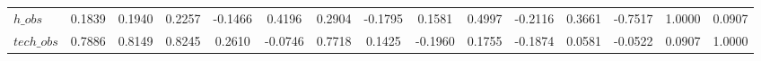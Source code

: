 \begin{center}
\begin{longtable}{lcccccccccccccc}
$h\_obs         $	 & 	           0.1839	 & 	           0.1940	 & 	           0.2257	 & 	          -0.1466	 & 	           0.4196	 & 	           0.2904	 & 	          -0.1795	 & 	           0.1581	 & 	           0.4997	 & 	          -0.2116	 & 	           0.3661	 & 	          -0.7517	 & 	           1.0000	 & 	           0.0907 \\ 
$tech\_obs      $	 & 	           0.7886	 & 	           0.8149	 & 	           0.8245	 & 	           0.2610	 & 	          -0.0746	 & 	           0.7718	 & 	           0.1425	 & 	          -0.1960	 & 	           0.1755	 & 	          -0.1874	 & 	           0.0581	 & 	          -0.0522	 & 	           0.0907	 & 	           1.0000 \\ 
\end{longtable}
 \end{center}

